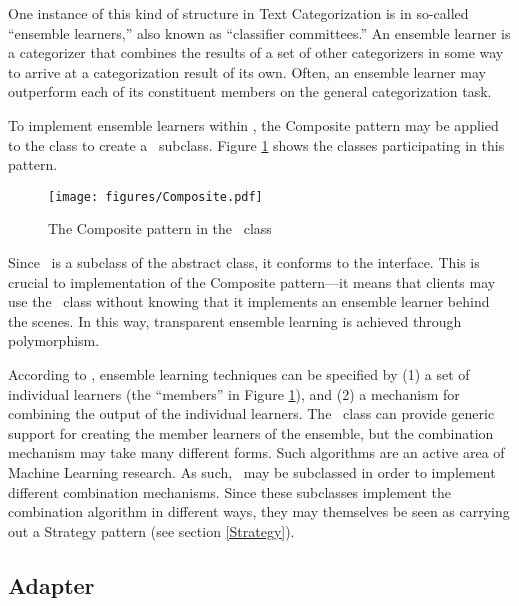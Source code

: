 One instance of this kind of structure in Text Categorization is in
so-called ``ensemble learners,'' also known as ``classifier
committees.''  An ensemble learner is a categorizer that combines the
results of a set of other categorizers in some way to arrive at a
categorization result of its own. \cite[p. 30]{sebastiani:02} Often,
an ensemble learner may outperform each of its constituent members on
the general categorization task.  \cite{tumer:98}

To implement ensemble learners within \aicat, the Composite
pattern may be applied to the  class to create a
\ensemble\ subclass.  Figure \ref{Composite-ensemble}
shows the classes participating in this pattern.

\begin{figure}
\texttt{[image: figures/Composite.pdf]}
\caption{The Composite pattern in the \ensemble\ class}
\label{Composite-ensemble}
\end{figure}

Since \ensemble\ is a subclass of the abstract
 class, it conforms to the  interface.
This is crucial to implementation of the Composite pattern---it means
that clients may use the \ensemble\ class without
knowing that it implements an ensemble learner behind the scenes.  In
this way, transparent ensemble learning is achieved through
polymorphism.

According to \cite[p. 30]{sebastiani:02}, ensemble learning techniques
can be specified by (1) a set of individual learners (the ``members''
in Figure \ref{Composite-ensemble}), and (2) a mechanism for combining
the output of the individual learners.  The \ensemble\
class can provide generic support for creating the member learners of
the ensemble, but the combination mechanism may take many different
forms.  Such algorithms are an active area of Machine Learning
research.  As such, \ensemble\ may be subclassed in
order to implement different combination mechanisms.  Since these
subclasses implement the combination algorithm in different ways, they
may themselves be seen as carrying out a Strategy pattern (see section
\ref{Strategy}).


\subsection{Adapter}

